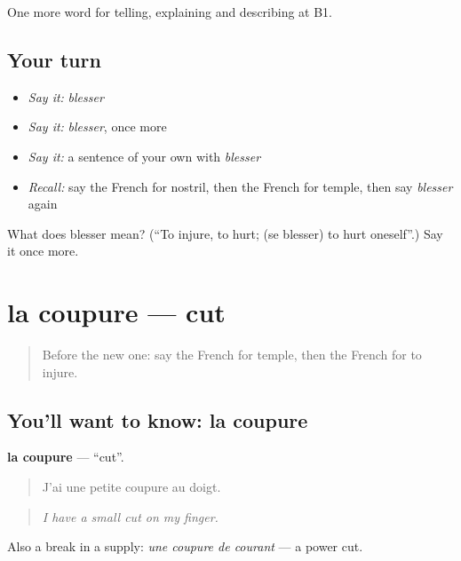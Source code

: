 \begin{grammarlens}[title={What you've built}]
One more word for telling, explaining and describing at B1.
\end{grammarlens}

\subsection*{Your turn}
\begin{itemize}
\raggedright
  \item \emph{Say it:} \emph{blesser}
  \item \emph{Say it:} \emph{blesser}, once more
  \item \emph{Say it:} a sentence of your own with \emph{blesser}
  \item \emph{Recall:} say the French for nostril, then the French for temple, then say \emph{blesser} again
\end{itemize}

\begin{tcolorbox}[breakable,colback=teal!4,colframe=teal!35!black,title={Before you move on}]
What does blesser mean? (\textquotedblleft{}To injure, to hurt; (se blesser) to hurt oneself\textquotedblright{}.) Say it once more.
\end{tcolorbox}
\section[la coupure]{la coupure — cut}

\label{lesson:FR-C479-coupure}



\begin{quote}
Before the new one: say the French for temple, then the French for to injure.
\end{quote}

\subsection*{You'll want to know: la coupure}
\textbf{la coupure} — \textquotedblleft{}cut\textquotedblright{}.

\begin{quote}
J'ai une petite coupure au doigt.
\end{quote}

\begin{quote}
\emph{I have a small cut on my finger.}
\end{quote}

Also a break in a supply: \emph{une coupure de courant} — a power cut.

